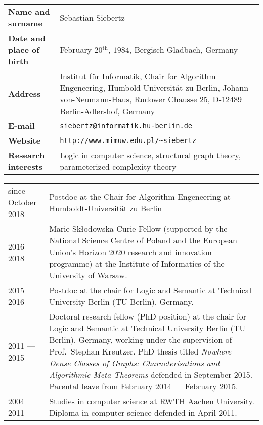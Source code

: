 
\begin{small}
\noindent
\begin{tabular}{@{\hspace{0cm}}l @{\hspace{5mm}} p{12cm}}
{\bf Name and surname} & Sebastian Siebertz\\[0.1cm]
{\bf Date and place of birth} & February 20$^{\textrm{th}}$, $1984$, Bergisch-Gladbach, Germany\\[0.1cm]
{\bf Address} & Institut f\"ur Informatik, Chair for Algorithm Engeneering, Humbold-Universit\"at zu Berlin, Johann-von-Neumann-Haus, Rudower Chausse 25, 
D-12489 Berlin-Adlershof, Germany\\[0.1cm]
{\bf E-mail} & \verb+siebertz@informatik.hu-berlin.de+\\[0.1cm]
{\bf Website} & \verb+http://www.mimuw.edu.pl/~siebertz+\\[0.1cm]
{\bf Research interests} & 
Logic in computer science, structural graph theory, 
parameterized complexity theory
\end{tabular}
\end{small}

\begin{small}
\noindent
\begin{tabular}{@{}p{3cm} @{\hspace{2mm}} p{13.2cm}}
since October 2018 & Postdoc at the Chair for Algorithm Engeneering 
 at Humboldt-Universit\"at zu Berlin \\[0.2cm]
2016 --- 2018 & Marie Sk\l odowska-Curie Fellow (supported by the National Science Centre of Poland and the European Union's Horizon 2020 research and 
innovation  programme) at the Institute of Informatics of the University of
    Warsaw. \\[0.2cm]
2015 --- 2016 & Postdoc at the 
chair for Logic and Semantic at Technical University Berlin (TU Berlin), Germany.\\[0.2cm]
2011 --- 2015 & Doctoral research fellow (PhD position) at the 
chair for Logic and Semantic at
Technical University Berlin (TU Berlin), Germany, working under the supervision of Prof.\ Stephan Kreutzer.
PhD thesis titled \emph{Nowhere Dense Classes of Graphs: Characterisations and Algorithmic Meta-Theorems} defended in September 2015.  Parental leave from February 2014 --- February 2015.\\[0.2cm]
2004 --- 2011 & Studies in computer science at RWTH 
Aachen University. Diploma in computer science defended
in April 2011. 

\end{tabular}
\end{small}

